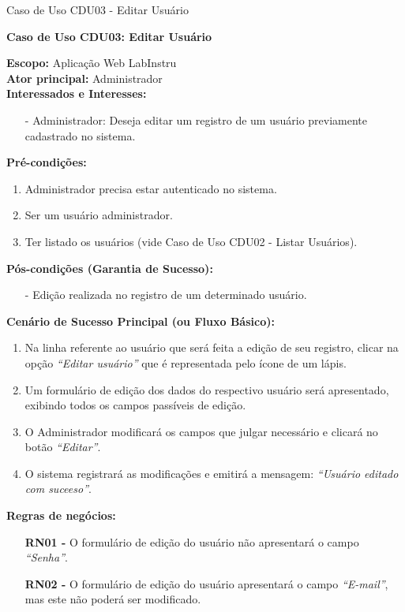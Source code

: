 \begin{quadro}[H]
	\centering
	\caption{Caso de Uso CDU03 - Editar Usuário}

	\begin{framed}
		\textbf{Caso de Uso CDU03: Editar Usuário}\\
		\begin{flushleft}
		\textbf{Escopo:} Aplicação Web LabInstru\\
		\textbf{Ator principal:} Administrador\\
		\textbf{Interessados e Interesses:}
		\begin{itemize}
			\item[-] Administrador: Deseja editar um registro de um usuário previamente cadastrado no sistema.
		\end{itemize}
		\textbf{Pré-condições:}\\
			 \begin{enumerate}
			 	\item{Administrador precisa estar autenticado no sistema.}
			 	\item{Ser um usuário administrador.}
			 	\item{Ter listado os usuários (vide Caso de Uso CDU02 - Listar Usuários).}
			 \end{enumerate}
		\textbf{Pós-condições (Garantia de Sucesso):}
		\begin{itemize}
			\item[-] Edição realizada no registro de um determinado usuário.
		\end{itemize}

		\textbf{Cenário de Sucesso Principal (ou Fluxo Básico):}\\
			\begin{enumerate}
				\item{Na linha referente ao usuário que será feita a edição de seu registro, clicar na opção \textit{``Editar usuário''} que é representada pelo ícone  de um lápis.}
				\item{Um formulário de edição dos dados do respectivo usuário será apresentado, exibindo todos os campos passíveis de edição. }
				\item{O Administrador modificará os campos que julgar necessário e clicará no botão \textit{``Editar''}.}
				\item{O sistema registrará as modificações e emitirá a mensagem: \textit{``Usuário editado com suceeso''}.}
			 \end{enumerate}

			 \textbf{Regras de negócios:}
		\begin{itemize}
			\item[] \textbf{RN01 - } O formulário de edição do usuário não apresentará o campo \textit{``Senha''}.
			\item[] \textbf{RN02 - } O formulário de edição do usuário apresentará o campo \textit{``E-mail''}, mas este não poderá ser modificado.
		\end{itemize}


\end{flushleft}
\end{framed}
\end{quadro}
